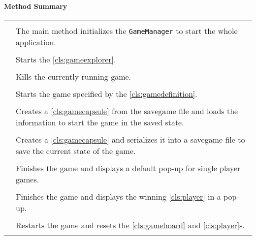 \centerdash

\paragraph*{Method Summary}
\paragraph*{}
\begin{longtable}{Lp{10cm}}
	\startmethodtable
	 \\
	& The main method initializes the \texttt{GameManager} to start the whole application. \\
	 \\
	& Starts the \ref{cls:gameexplorer}. \\
	 \\
	& Kills the currently running game. \\
	 \\
	& Starts the game specified by the \ref{cls:gamedefinition}. \\
	 \\
	& Creates a \ref{cls:gamecapsule} from the savegame file and loads the information to start the game in the saved state. \\
	 \\
	& Creates a \ref{cls:gamecapsule} and serializes it into a savegame file to save the current state of the game. \\
	 \\
	& Finishes the game and displays a default pop-up for single player games. \\
	 \\
	& Finishes the game and displays the winning \ref{cls:player} in a pop-up.  \\
	 \\
	& Restarts the game and resets the \ref{cls:gameboard} and \ref{cls:player}s. \\
	 \\

\end{longtable}
